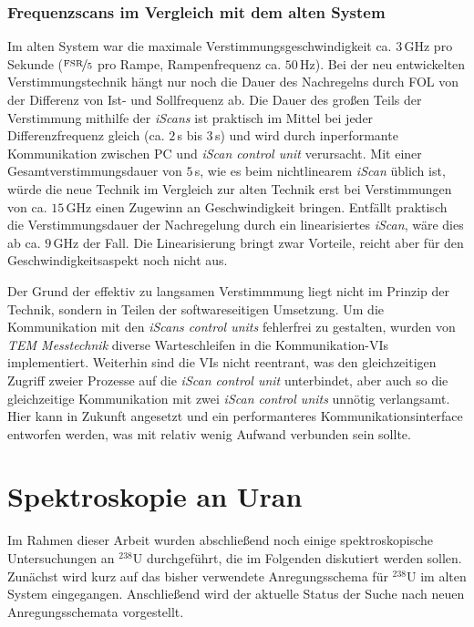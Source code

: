 \subsubsection{Frequenzscans im
Vergleich mit dem alten
System}\label{subsubsec:frequenz_scans_vergleich_mit_altem_system}
Im alten System war die maximale Verstimmungsgeschwindigkeit ca. $3\,$GHz pro
Sekunde ($\nicefrac{\text{FSR}}{5}$ pro Rampe, Rampenfrequenz ca. $50\,$Hz). Bei
der neu entwickelten Verstimmungstechnik hängt nur noch die Dauer des
Nachregelns durch FOL von der Differenz von Ist- und Sollfrequenz ab. Die Dauer
des großen Teils der Verstimmung mithilfe der \textit{iScans} ist praktisch im Mittel bei jeder Differenzfrequenz gleich (ca. $2\,$s bis $3\,$s) und
wird durch inperformante Kommunikation zwischen PC und \textit{iScan control
unit} verursacht. Mit einer Gesamtverstimmungsdauer von $5\,$s, wie es beim
nichtlinearem \textit{iScan} üblich ist, würde die neue Technik im
Vergleich zur alten Technik erst bei Verstimmungen von ca. $15\,$GHz einen
Zugewinn an Geschwindigkeit bringen.
Entfällt praktisch die Verstimmungsdauer der Nachregelung durch ein
linearisiertes \textit{iScan}, wäre dies ab ca. $9\,$GHz der Fall.
Die Linearisierung bringt zwar Vorteile, reicht aber für den
Geschwindigkeitsaspekt noch nicht aus.\par
Der Grund der effektiv zu langsamen Verstimmmung liegt nicht im Prinzip der
Technik, sondern in Teilen der softwareseitigen Umsetzung. Um die Kommunikation
mit den \textit{iScans control units} fehlerfrei zu gestalten, wurden von \textit{TEM
Messtechnik} diverse Warteschleifen in die Kommunikation-VIs implementiert.
Weiterhin sind die VIs nicht reentrant, was den gleichzeitigen Zugriff zweier Prozesse auf die \textit{iScan control unit}
unterbindet, aber auch so die gleichzeitige Kommunikation mit zwei \textit{iScan
control units} unnötig verlangsamt. Hier kann in Zukunft angesetzt
und ein performanteres Kommunikationsinterface entworfen werden, was mit relativ
wenig Aufwand verbunden sein sollte.

\section{Spektroskopie an Uran}\label{sec:spektroskopie}
Im Rahmen dieser Arbeit wurden abschließend noch einige spektroskopische
Untersuchungen an $^{238}$U durchgeführt, die im Folgenden diskutiert werden
sollen. Zunächst wird kurz auf das bisher verwendete Anregungsschema für
$^{238}$U im alten System eingegangen. Anschließend wird der aktuelle Status
der Suche nach neuen Anregungsschemata vorgestellt.

